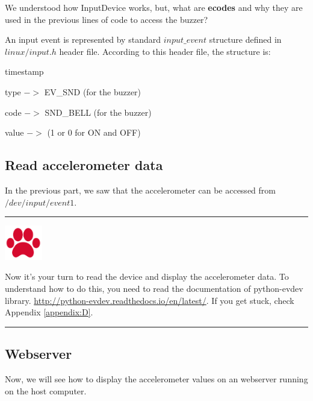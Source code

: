 \begin{enumerate}
We understood how InputDevice works, but, what are \textbf{ecodes} and why they are used in the previous lines of code to access the buzzer?

An input event is represented by standard $input\_event$ structure defined in $linux/input.h$ header file. According to this header file,  the structure is: 
\begin{myitemize}
\item timestamp
\item type $->$ EV\_SND (for the buzzer)
\item code $->$ SND\_BELL (for the buzzer)
\item value $->$ (1 or 0 for ON and OFF)
\end{myitemize}


\end{enumerate}



\subsection{Read accelerometer data}

In the previous part, we saw that the accelerometer can be accessed from $/dev/input/event1$. 


\noindent\rule{16.5cm}{1pt}

\noindent\begin{minipage}{.1\textwidth}
  \centering
  \includegraphics[height=1.5cm]{img/icon.png}
\end{minipage}
\begin{minipage}{.8\textwidth}
Now it's your turn to read the device and display the accelerometer data. To understand how to do this, you need to read the documentation of python-evdev library. 
\url{http://python-evdev.readthedocs.io/en/latest/}. If you get stuck, check Appendix \cref{appendix:D}.
\end{minipage}%

\noindent\rule{16.5cm}{1pt}



\subsection{Webserver}
Now, we will see how to display the accelerometer values on an webserver running on the host computer.

